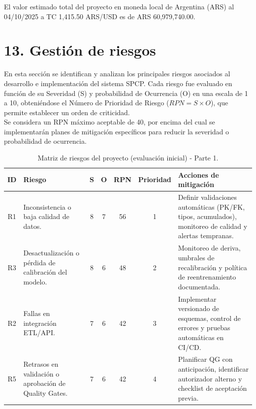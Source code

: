\documentclass[12pt]
{charter}
\begin{document}
El valor estimado total del proyecto en moneda local de Argentina (ARS) al 04/10/2025 a TC 1,415.50 ARS/USD es de ARS 60,979,740.00.

\section{13. Gestión de riesgos}
\label{sec:riesgos}

En esta sección se identifican y analizan los principales riesgos asociados al desarrollo e implementación del sistema SPCP.
Cada riesgo fue evaluado en función de su Severidad (S) y probabilidad de Ocurrencia (O) en una escala de 1 a 10,
obteniéndose el Número de Prioridad de Riesgo ($RPN = S \times O$), que permite establecer un orden de criticidad. \\

Se considera un RPN máximo aceptable de 40, por encima del cual se implementarán planes de mitigación específicos para reducir la severidad o probabilidad de ocurrencia.

\begin{table}[ht]
\centering
\scriptsize
\caption{Matriz de riesgos del proyecto (evaluación inicial) - Parte 1.}
\label{tab:riesgos-a}
\begin{tabularx}{\textwidth}{cXccccX}
\toprule
\textbf{ID} & \textbf{Riesgo} & \textbf{S} & \textbf{O} & \textbf{RPN} & \textbf{Prioridad} & \textbf{Acciones de mitigación} \\
\midrule
R1 & Inconsistencia o baja calidad de datos. & 8 & 7 & 56 & 1 &
Definir validaciones automáticas (PK/FK, tipos, acumulados), monitoreo de calidad y alertas tempranas. \\
R3 & Desactualización o pérdida de calibración del modelo. & 8 & 6 & 48 & 2 &
Monitoreo de deriva, umbrales de recalibración y política de reentrenamiento documentada. \\
R2 & Fallas en integración ETL/API. & 7 & 6 & 42 & 3 &
Implementar versionado de esquemas, control de errores y pruebas automáticas en CI/CD. \\
R5 & Retrasos en validación o aprobación de Quality Gates. & 7 & 6 & 42 & 4 &
Planificar QG con anticipación, identificar autorizador alterno y checklist de aceptación previa. \\
\bottomrule
\end{tabularx}
\end{table}

\newpage
\end{document}
